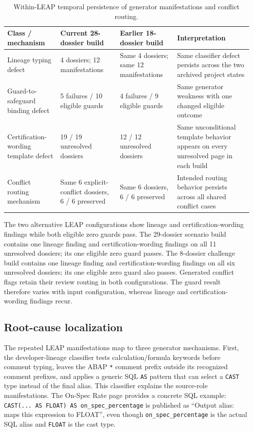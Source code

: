 \documentclass[a4paper,fleqn]{cas-dc}
\begin{document}
\begin{table}[t]
\centering
\caption{Within-LEAP temporal persistence of generator manifestations and conflict routing.}
\label{tab:results}
\begin{tabularx}{\textwidth}{@{}lYY Y@{}}
\toprule
Class / mechanism & Current 28-dossier build & Earlier 18-dossier build & Interpretation \\
\midrule
Lineage typing defect & 4 dossiers; 12 manifestations & Same 4 dossiers; same 12 manifestations & Same classifier defect persists across the two archived project states \\
Guard-to-safeguard binding defect & 5 failures / 10 eligible guards & 4 failures / 9 eligible guards & Same generator weakness with one changed eligible outcome \\
Certification-wording template defect & 19 / 19 unresolved dossiers & 12 / 12 unresolved dossiers & Same unconditional template behavior appears on every unresolved page in each build \\
Conflict routing mechanism & Same 6 explicit-conflict dossiers, 6 / 6 preserved & Same 6 dossiers, 6 / 6 preserved & Intended routing behavior persists across all shared conflict cases \\
\bottomrule
\end{tabularx}
\end{table}

The two alternative LEAP configurations show lineage and certification-wording findings while both eligible zero guards pass. The 29-dossier scenario build contains one lineage finding and certification-wording findings on all 11 unresolved dossiers; its one eligible zero guard passes. The 8-dossier challenge build contains one lineage finding and certification-wording findings on all six unresolved dossiers; its one eligible zero guard also passes. Generated conflict flags retain their review routing in both configurations. The guard result therefore varies with input configuration, whereas lineage and certification-wording findings recur.

\subsection{Root-cause localization}
The repeated LEAP manifestations map to three generator mechanisms. First, the developer-lineage classifier tests calculation/formula keywords before comment typing, leaves the ABAP \texttt{*} comment prefix outside its recognized comment prefixes, and applies a generic SQL \texttt{AS} pattern that can select a \texttt{CAST} type instead of the final alias. This classifier explains the source-role manifestations. The On-Spec Rate page provides a concrete SQL example: \texttt{CAST(... AS FLOAT) AS on\_spec\_percentage} is published as ``Output alias: maps this expression to FLOAT'', even though \texttt{on\_spec\_percentage} is the actual SQL alias and \texttt{FLOAT} is the cast type.
\end{document}
